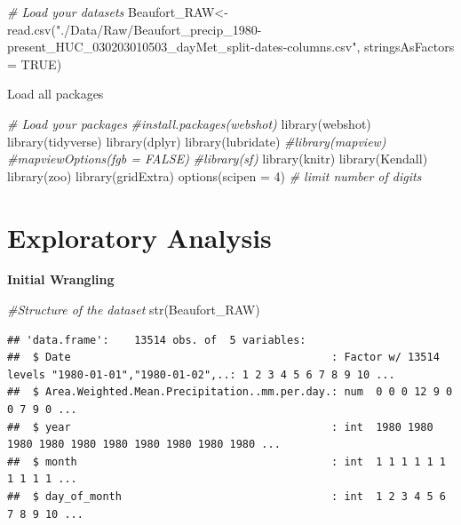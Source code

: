 \documentclass[
  12pt,
]{article}
\newenvironment{Shaded}{\begin{snugshade}}{\end{snugshade}}
\newcommand{\AttributeTok}[1]{\textcolor[rgb]{0.77,0.63,0.00}{#1}}
\newcommand{\CommentTok}[1]{\textcolor[rgb]{0.56,0.35,0.01}{\textit{#1}}}
\newcommand{\ConstantTok}[1]{\textcolor[rgb]{0.00,0.00,0.00}{#1}}
\newcommand{\DecValTok}[1]{\textcolor[rgb]{0.00,0.00,0.81}{#1}}
\newcommand{\FunctionTok}[1]{\textcolor[rgb]{0.00,0.00,0.00}{#1}}
\newcommand{\NormalTok}[1]{#1}
\newcommand{\OtherTok}[1]{\textcolor[rgb]{0.56,0.35,0.01}{#1}}
\newcommand{\StringTok}[1]{\textcolor[rgb]{0.31,0.60,0.02}{#1}}
\begin{document}
\begin{Shaded}
\begin{Highlighting}[]
\CommentTok{\# Load your datasets}
\NormalTok{Beaufort\_RAW}\OtherTok{\textless{}{-}}\FunctionTok{read.csv}\NormalTok{(}\StringTok{"./Data/Raw/Beaufort\_precip\_1980{-}present\_HUC\_030203010503\_dayMet\_split{-}dates{-}columns.csv"}\NormalTok{, }\AttributeTok{stringsAsFactors =} \ConstantTok{TRUE}\NormalTok{)}
\end{Highlighting}
\end{Shaded}

Load all packages

\begin{Shaded}
\begin{Highlighting}[]
\CommentTok{\# Load your packages}
\CommentTok{\#install.packages(webshot)}
\FunctionTok{library}\NormalTok{(webshot)}
\FunctionTok{library}\NormalTok{(tidyverse)}
\FunctionTok{library}\NormalTok{(dplyr)}
\FunctionTok{library}\NormalTok{(lubridate)}
\CommentTok{\#library(mapview)}
\CommentTok{\#mapviewOptions(fgb = FALSE)}
\CommentTok{\#library(sf)}
\FunctionTok{library}\NormalTok{(knitr)}
\FunctionTok{library}\NormalTok{(Kendall)}
\FunctionTok{library}\NormalTok{(zoo)}
\FunctionTok{library}\NormalTok{(gridExtra)}
\FunctionTok{options}\NormalTok{(}\AttributeTok{scipen =} \DecValTok{4}\NormalTok{) }\CommentTok{\# limit number of digits }
\end{Highlighting}
\end{Shaded}

\newpage

\hypertarget{exploratory-analysis}{%
\section{Exploratory Analysis}\label{exploratory-analysis}}

\textbf{Initial Wrangling}

\begin{Shaded}
\begin{Highlighting}[]
\CommentTok{\#Structure of the dataset}
\FunctionTok{str}\NormalTok{(Beaufort\_RAW)}
\end{Highlighting}
\end{Shaded}

\begin{verbatim}
## 'data.frame':    13514 obs. of  5 variables:
##  $ Date                                         : Factor w/ 13514 levels "1980-01-01","1980-01-02",..: 1 2 3 4 5 6 7 8 9 10 ...
##  $ Area.Weighted.Mean.Precipitation..mm.per.day.: num  0 0 0 12 9 0 0 7 9 0 ...
##  $ year                                         : int  1980 1980 1980 1980 1980 1980 1980 1980 1980 1980 ...
##  $ month                                        : int  1 1 1 1 1 1 1 1 1 1 ...
##  $ day_of_month                                 : int  1 2 3 4 5 6 7 8 9 10 ...
\end{verbatim}
\end{document}
